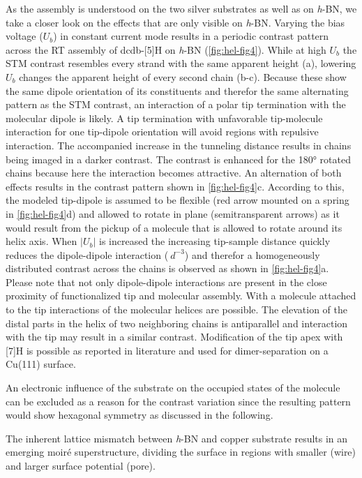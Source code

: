 As the assembly is understood on the two silver substrates as well as on \textit{h}-BN, we take a closer look on the effects that are only visible on \textit{h}-BN. Varying the bias voltage ($U_b$) in constant current mode results in a periodic contrast pattern across the RT assembly of dcdb-[5]H on \textit{h}-BN (\autoref{fig:hel-fig4}). While at high $U_b$ the STM contrast resembles every strand with the same apparent height (a), lowering $U_b$ changes the apparent height of every second chain (b-c). Because these show the same dipole orientation of its constituents and therefor the same alternating pattern as the STM contrast, an interaction of a polar tip termination with the molecular dipole is likely. A tip termination with unfavorable tip-molecule interaction for one tip-dipole orientation will avoid regions with repulsive interaction. The accompanied increase in the tunneling distance results in chains being imaged in a darker contrast. The contrast is enhanced for the 180° rotated chains because here the interaction becomes attractive. An alternation of both effects results in the contrast pattern shown in \autoref{fig:hel-fig4}c. According to this, the modeled tip-dipole is assumed to be flexible (red arrow mounted on a spring in \autoref{fig:hel-fig4}d) and allowed to rotate in plane (semitransparent arrows) as it would result from the pickup of a molecule that is allowed to rotate around its helix axis. When $|U_b|$ is increased the increasing tip-sample distance quickly reduces the dipole-dipole interaction ($~d^{-3}$) and therefor a homogeneously distributed contrast across the chains is observed as shown in \autoref{fig:hel-fig4}a. Please note that not only dipole-dipole interactions are present in the close proximity of functionalized tip and molecular assembly. With a molecule attached to the tip  interactions of the molecular helices are possible. The elevation of the distal parts in the helix of two neighboring chains is antiparallel and interaction with the tip may result in a similar contrast. Modification of the tip apex with [7]H is possible as reported in literature\cite{Ernst_Stereochemical_2016} and used for dimer-separation on a Cu(111) surface.

An electronic influence of the substrate on the occupied states of the molecule can be excluded as a reason for the contrast variation since the resulting pattern would show hexagonal symmetry as discussed in the following.

The inherent lattice mismatch between \textit{h}-BN and copper substrate results in an emerging moir\'e superstructure\cite{joshi_boron_2012}, dividing the surface in regions with smaller (wire) and larger surface potential (pore)\cite{Koitz_Structural_2013}. 

